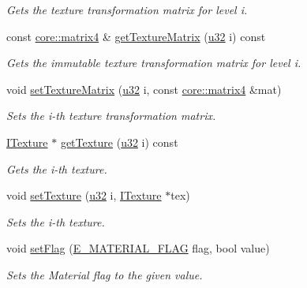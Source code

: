 \begin{DoxyCompactItemize}
\begin{DoxyCompactList}\small\item\em Gets the texture transformation matrix for level i. \end{DoxyCompactList}\item 
const \hyperlink{namespaceirr_1_1core_a4c9d4e29899535971052810954a14431}{core\+::matrix4} \& \hyperlink{classirr_1_1video_1_1SMaterial_a6b0adff4b14c80da0be8e8d600252fcd}{get\+Texture\+Matrix} (\hyperlink{namespaceirr_a0416a53257075833e7002efd0a18e804}{u32} i) const
\begin{DoxyCompactList}\small\item\em Gets the immutable texture transformation matrix for level i. \end{DoxyCompactList}\item 
void \hyperlink{classirr_1_1video_1_1SMaterial_a6e1a89f5005226a9cecb5272ef44ba7d}{set\+Texture\+Matrix} (\hyperlink{namespaceirr_a0416a53257075833e7002efd0a18e804}{u32} i, const \hyperlink{namespaceirr_1_1core_a4c9d4e29899535971052810954a14431}{core\+::matrix4} \&mat)
\begin{DoxyCompactList}\small\item\em Sets the i-\/th texture transformation matrix. \end{DoxyCompactList}\item 
\hyperlink{classirr_1_1video_1_1ITexture}{I\+Texture} $\ast$ \hyperlink{classirr_1_1video_1_1SMaterial_ad5883da3db8087fbbb74f7bb23e82874}{get\+Texture} (\hyperlink{namespaceirr_a0416a53257075833e7002efd0a18e804}{u32} i) const
\begin{DoxyCompactList}\small\item\em Gets the i-\/th texture. \end{DoxyCompactList}\item 
void \hyperlink{classirr_1_1video_1_1SMaterial_a44dc38e7d4a78434d12ffd02e88e3d60}{set\+Texture} (\hyperlink{namespaceirr_a0416a53257075833e7002efd0a18e804}{u32} i, \hyperlink{classirr_1_1video_1_1ITexture}{I\+Texture} $\ast$tex)
\begin{DoxyCompactList}\small\item\em Sets the i-\/th texture. \end{DoxyCompactList}\item 
void \hyperlink{classirr_1_1video_1_1SMaterial_a460db947d8e2022c6be895b77a65bbda}{set\+Flag} (\hyperlink{namespaceirr_1_1video_a8a3bc00ae8137535b9fbc5f40add70d3}{E\+\_\+\+M\+A\+T\+E\+R\+I\+A\+L\+\_\+\+F\+L\+AG} flag, bool value)
\begin{DoxyCompactList}\small\item\em Sets the Material flag to the given value. \end{DoxyCompactList}\item 

\end{DoxyCompactItemize}
